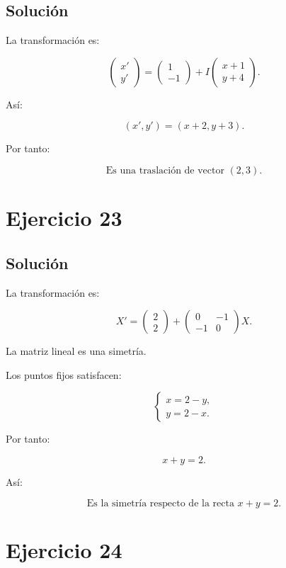 \documentclass[11pt,a4paper]{article}
\begin{document}
\subsection{Solución}

La transformación es:

\[
\begin{pmatrix}
x'\\
y'
\end{pmatrix}
=
\begin{pmatrix}
1\\
-1
\end{pmatrix}
+
I
\begin{pmatrix}
x+1\\
y+4
\end{pmatrix}.
\]

Así:

\[
(x',y')=(x+2,y+3).
\]

Por tanto:

\[
\boxed{
\text{Es una traslación de vector }(2,3).
}
\]

\section{Ejercicio 23}
\subsection{Solución}

La transformación es:

\[
X'
=
\begin{pmatrix}
2\\
2
\end{pmatrix}
+
\begin{pmatrix}
0&-1\\
-1&0
\end{pmatrix}
X.
\]

La matriz lineal es una simetría.

Los puntos fijos satisfacen:

\[
\begin{cases}
x=2-y,\\
y=2-x.
\end{cases}
\]

Por tanto:

\[
x+y=2.
\]

Así:

\[
\boxed{
\text{Es la simetría respecto de la recta }x+y=2.
}
\]

\section{Ejercicio 24}
\end{document}
